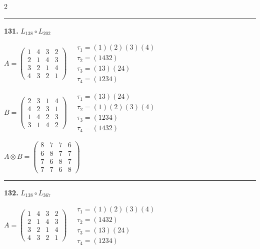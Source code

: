 \begin{multicols}{2}
\vspace{0.3em}
\hrule
\vspace{0.3em}

\noindent\textbf{131.} $L_{138} \circ L_{202}$

$A = \begin{pmatrix} 1 & 4 & 3 & 2 \\ 2 & 1 & 4 & 3 \\ 3 & 2 & 1 & 4 \\ 4 & 3 & 2 & 1 \end{pmatrix} \quad \begin{matrix} \tau_{1}=(1)(2)(3)(4) \\ \tau_{2}=(1 4 3 2) \\ \tau_{3}=(1 3)(2 4) \\ \tau_{4}=(1 2 3 4) \end{matrix}$

$B = \begin{pmatrix} 2 & 3 & 1 & 4 \\ 4 & 2 & 3 & 1 \\ 1 & 4 & 2 & 3 \\ 3 & 1 & 4 & 2 \end{pmatrix} \quad \begin{matrix} \tau_{1}=(1 3)(2 4) \\ \tau_{2}=(1)(2)(3)(4) \\ \tau_{3}=(1 2 3 4) \\ \tau_{4}=(1 4 3 2) \end{matrix}$

$A \otimes B = \begin{pmatrix} 8 & 7 & 7 & 6 \\ 6 & 8 & 7 & 7 \\ 7 & 6 & 8 & 7 \\ 7 & 7 & 6 & 8 \end{pmatrix}$

\vspace{0.3em}
\hrule
\vspace{0.3em}

\noindent\textbf{132.} $L_{138} \circ L_{367}$

$A = \begin{pmatrix} 1 & 4 & 3 & 2 \\ 2 & 1 & 4 & 3 \\ 3 & 2 & 1 & 4 \\ 4 & 3 & 2 & 1 \end{pmatrix} \quad \begin{matrix} \tau_{1}=(1)(2)(3)(4) \\ \tau_{2}=(1 4 3 2) \\ \tau_{3}=(1 3)(2 4) \\ \tau_{4}=(1 2 3 4) \end{matrix}$


\end{multicols}

